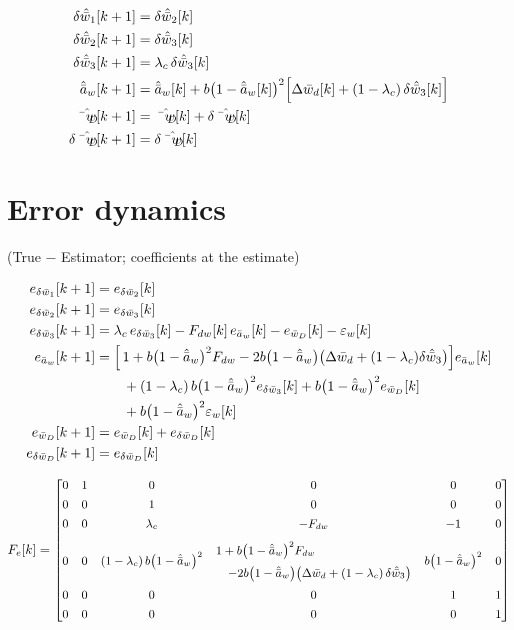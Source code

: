 \documentclass[11pt,a4paper,fontset=none]{ctexart}
\newcommand{\ba}{\bar{a}}
\newcommand{\bw}{\bar{w}}
\newcommand{\bwD}{\bar{w}_D}
\begin{document}
\begin{align*}
\delta\hat{\bw}_1[k+1] &= \delta\hat{\bw}_2[k] \\
\delta\hat{\bw}_2[k+1] &= \delta\hat{\bw}_3[k] \\
\delta\hat{\bw}_3[k+1] &= \lambda_c\,\delta\hat{\bw}_3[k] \\
\hat{\ba}_w[k+1]       &= \hat{\ba}_w[k]
  + b\bigl(1-\hat{\ba}_w[k]\bigr)^{2}
    \Bigl[\Delta\bw_d[k] + (1-\lambda_c)\,\delta\hat{\bw}_3[k]\Bigr] \\
\hat{\bwD}[k+1]        &= \hat{\bwD}[k] + \delta\hat{\bwD}[k] \\
\delta\hat{\bwD}[k+1]  &= \delta\hat{\bwD}[k]
\end{align*}

\section{Error dynamics}

(True $-$ Estimator; coefficients at the estimate)

\begin{align*}
e_{\delta\bw_1}[k+1] &= e_{\delta\bw_2}[k] \\
e_{\delta\bw_2}[k+1] &= e_{\delta\bw_3}[k] \\
e_{\delta\bw_3}[k+1] &= \lambda_c\,e_{\delta\bw_3}[k]
  - F_{dw}[k]\,e_{\ba_w}[k] - e_{\bwD}[k] - \varepsilon_w[k] \\
e_{\ba_w}[k+1] &= \Bigl[\,1
  + b\bigl(1-\hat{\ba}_w\bigr)^{2}F_{dw}
  - 2b\bigl(1-\hat{\ba}_w\bigr)
    \bigl(\Delta\bw_d + (1-\lambda_c)\delta\hat{\bw}_3\bigr)\Bigr] e_{\ba_w}[k] \\
  &\qquad + (1-\lambda_c)\,b\bigl(1-\hat{\ba}_w\bigr)^{2}
      e_{\delta\bw_3}[k]
    + b\bigl(1-\hat{\ba}_w\bigr)^{2} e_{\bwD}[k] \\
  &\qquad + b\bigl(1-\hat{\ba}_w\bigr)^{2}\varepsilon_w[k] \\
e_{\bwD}[k+1] &= e_{\bwD}[k] + e_{\delta\bwD}[k] \\
e_{\delta\bwD}[k+1] &= e_{\delta\bwD}[k]
\end{align*}

\begin{equation*}
\small
F_e[k] =
\begin{bmatrix}
0 & 1 & 0 & 0 & 0 & 0 \\[0.4em]
0 & 0 & 1 & 0 & 0 & 0 \\[0.4em]
0 & 0 & \lambda_c & -F_{dw} & -1 & 0 \\[0.8em]
0 & 0 & (1-\lambda_c)\,b\bigl(1-\hat{\ba}_w\bigr)^{2}
  & \begin{array}{@{}l@{}}
      1 + b\bigl(1-\hat{\ba}_w\bigr)^{2}F_{dw} \\[0.6em]
      \quad - 2b\bigl(1-\hat{\ba}_w\bigr)
        \bigl(\Delta\bw_d + (1-\lambda_c)\,\delta\hat{\bw}_3\bigr)
    \end{array}
  & b\bigl(1-\hat{\ba}_w\bigr)^{2} & 0 \\[1.6em]
0 & 0 & 0 & 0 & 1 & 1 \\[0.4em]
0 & 0 & 0 & 0 & 0 & 1
\end{bmatrix}
\end{equation*}
\end{document}
